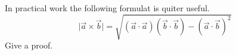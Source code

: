 In practical work the following formulat is quiter useful. 
\begin{equation}
	\vert\vec{a} \times \vec{b} \vert= \sqrt{\left(\vec{a}\cdot\vec{a}\right) \left(\vec{b}\cdot\vec{b}\right)-\left(\vec{a}\cdot\vec{b}\right)^2}
	\end{equation}
Give a proof.\\ 